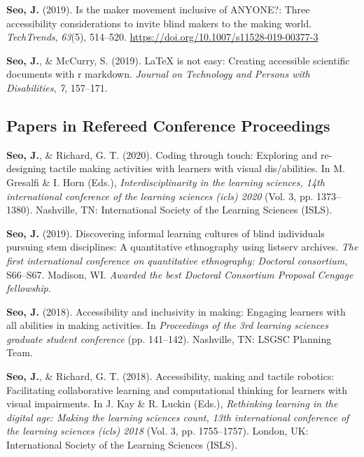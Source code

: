 \documentclass[11pt, a4paper]{awesome-cv}
\begin{document}
\leavevmode\hypertarget{ref-seo2019maker}{}%
\textbf{Seo, J.} (2019). Is the maker movement inclusive of ANYONE?:
Three accessibility considerations to invite blind makers to the making
world. \emph{TechTrends}, \emph{63}(5), 514--520.
\url{https://doi.org/10.1007/s11528-019-00377-3}

\leavevmode\hypertarget{ref-seo2019arow}{}%
\textbf{Seo, J.}, \& McCurry, S. (2019). LaTeX is not easy: Creating
accessible scientific documents with r markdown. \emph{Journal on
Technology and Persons with Disabilities}, \emph{7}, 157--171.

\hypertarget{papers-in-refereed-conference-proceedings}{%
\subsection{Papers in Refereed Conference
Proceedings}\label{papers-in-refereed-conference-proceedings}}

\hypertarget{refs_proceedings}{}
\leavevmode\hypertarget{ref-seo2020coding}{}%
\textbf{Seo, J.}, \& Richard, G. T. (2020). Coding through touch:
Exploring and re-designing tactile making activities with learners with
visual dis/abilities. In M. Gresalfi \& I. Horn (Eds.),
\emph{Interdisciplinarity in the learning sciences, 14th international
conference of the learning sciences (icls) 2020} (Vol. 3, pp.
1373--1380). Nashville, TN: International Society of the Learning
Sciences (ISLS).

\leavevmode\hypertarget{ref-seo2019discovering}{}%
\textbf{Seo, J.} (2019). Discovering informal learning cultures of blind
individuals pursuing stem disciplines: A quantitative ethnography using
listserv archives. \emph{The first international conference on
quantitative ethnography: Doctoral consortium}, S66--S67. Madison, WI.
\emph{Awarded the best Doctoral Consortium Proposal Cengage fellowship}.

\leavevmode\hypertarget{ref-seo2018making}{}%
\textbf{Seo, J.} (2018). Accessibility and inclusivity in making:
Engaging learners with all abilities in making activities. In
\emph{Proceedings of the 3rd learning sciences graduate student
conference} (pp. 141--142). Nashville, TN: LSGSC Planning Team.

\leavevmode\hypertarget{ref-seo2018accessibility}{}%
\textbf{Seo, J.}, \& Richard, G. T. (2018). Accessibility, making and
tactile robotics: Facilitating collaborative learning and computational
thinking for learners with visual impairments. In J. Kay \& R. Luckin
(Eds.), \emph{Rethinking learning in the digital age: Making the
learning sciences count, 13th international conference of the learning
sciences (icls) 2018} (Vol. 3, pp. 1755--1757). London, UK:
International Society of the Learning Sciences (ISLS).
\end{document}
